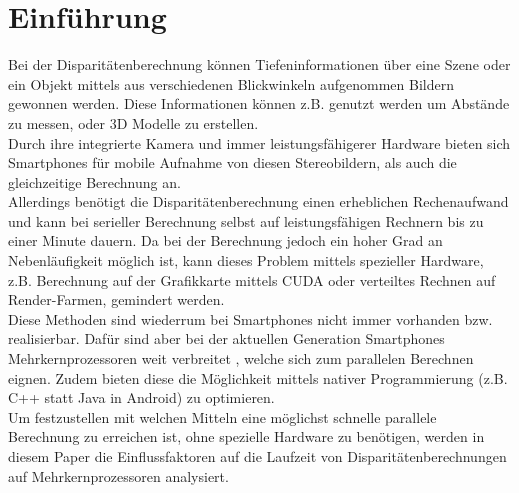 \documentclass[%
  a4paper,%
  12pt,%
  style=screen, %
  oneside,
  blue,%
  ]{tubsartcl}
\begin{document}
\section{Einführung} 
Bei der Disparitätenberechnung können Tiefeninformationen über eine Szene oder ein Objekt mittels aus verschiedenen
Blickwinkeln aufgenommen Bildern gewonnen werden. Diese Informationen können z.B. genutzt werden um Abstände zu
messen, oder 3D Modelle zu erstellen. \\
Durch ihre integrierte Kamera und immer leistungsfähigerer Hardware bieten sich Smartphones für mobile
Aufnahme von diesen Stereobildern, als auch die gleichzeitige Berechnung an. \\
Allerdings benötigt die Disparitätenberechnung einen erheblichen Rechenaufwand und kann bei serieller Berechnung selbst
auf leistungsfähigen Rechnern bis zu einer Minute dauern. Da bei der Berechnung jedoch ein hoher Grad an Nebenläufigkeit
möglich ist, kann dieses Problem mittels spezieller Hardware, z.B. Berechnung auf der Grafikkarte mittels CUDA oder
verteiltes Rechnen auf Render-Farmen, gemindert werden. \\
Diese Methoden sind wiederrum bei Smartphones nicht immer vorhanden bzw. realisierbar. Dafür sind aber bei der aktuellen
Generation Smartphones Mehrkernprozessoren weit verbreitet \cite{Smartphone_multiproc}, welche sich zum parallelen
Berechnen eignen.
Zudem bieten diese die Möglichkeit mittels nativer Programmierung (z.B. C++ statt Java in Android) zu optimieren. \\
Um festzustellen mit welchen Mitteln eine möglichst schnelle parallele Berechnung zu erreichen ist, ohne spezielle
Hardware zu benötigen, werden in diesem Paper die Einflussfaktoren auf die Laufzeit von Disparitätenberechnungen auf
Mehrkernprozessoren analysiert.  
\end{document}
